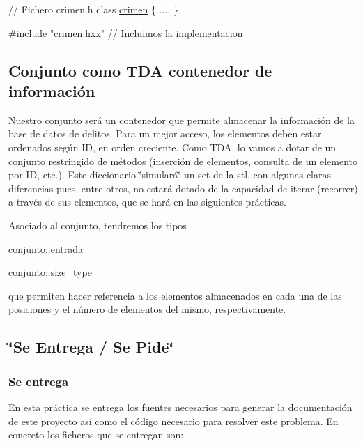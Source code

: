 \begin{DoxyCode}
\textcolor{comment}{// Fichero crimen.h  }
\textcolor{keyword}{class }\hyperlink{classcrimen}{crimen} \{
 ....
\}

\textcolor{preprocessor}{#include "crimen.hxx"} \textcolor{comment}{// Incluimos la implementacion}
\end{DoxyCode}
\hypertarget{index_dicc}{}\subsection{Conjunto como T\-D\-A contenedor de información}\label{index_dicc}
Nuestro conjunto será un contenedor que permite almacenar la información de la base de datos de delitos. Para un mejor acceso, los elementos deben estar ordenados según I\-D, en orden creciente. Como T\-D\-A, lo vamos a dotar de un conjunto restringido de métodos (inserción de elementos, consulta de un elemento por I\-D, etc.). Este diccionario \char`\"{}simulará\char`\"{} un set de la stl, con algunas claras diferencias pues, entre otros, no estará dotado de la capacidad de iterar (recorrer) a través de sus elementos, que se hará en las siguientes prácticas.

Asociado al conjunto, tendremos los tipos 
\begin{DoxyCode}
\hyperlink{classcrimen}{conjunto::entrada}

\hyperlink{classconjunto_a855a5893bb0f5a851ab2dbf2b8aa6cc7}{conjunto::size\_type}
\end{DoxyCode}
 que permiten hacer referencia a los elementos almacenados en cada una de las posiciones y el número de elementos del mismo, respectivamente.\hypertarget{index_sec_tar}{}\subsection{\char`\"{}\-Se Entrega / Se Pide\char`\"{}}\label{index_sec_tar}
\hypertarget{index_ssEntrega}{}\subsubsection{Se entrega}\label{index_ssEntrega}
En esta práctica se entrega los fuentes necesarios para generar la documentación de este proyecto así como el código necesario para resolver este problema. En concreto los ficheros que se entregan son\-:

